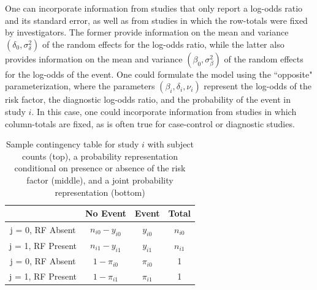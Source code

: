 \documentclass[AMA,STIX1COL]{WileyNJD-v2}
\begin{document}
One can incorporate information from studies that only report a log-odds ratio and its standard error, as well as from studies in which the row-totals were fixed by investigators. The former provide information on the mean and variance $(\delta_0, \sigma^2_\delta)$ of the random effects for the log-odds ratio, while the latter also provides information on the mean and variance $(\beta_0, \sigma^2_\beta)$ of the random effects for the log-odds of the event. One could formulate the model using the ``opposite" parameterization, where the parameters $(\beta_i, \delta_i, \nu_i)$ represent the log-odds of the risk factor, the diagnostic log-odds ratio, and the probability of the event in study $i$. In this case, one could incorporate information from studies in which column-totals are fixed, as is often true for case-control or diagnostic studies. 




\clearpage 


\begin{table}[ht]
\centering
\begin{tabular}{c|cc|c}
                           & No Event          & Event       & Total        \\ \hline
j = 0, RF Absent  & $n_{i0} - y_{i0}$ & $y_{i0}$    & $n_{i0}$     \\
j = 1, RF Present & $n_{i1} - y_{i1}$ & $y_{i1}$    & $n_{i1}$     \\ \hline
j = 0, RF Absent & $1 - \pi_{i0}$    & $\pi_{i0}$  & 1            \\
j = 1, RF Present & $1 - \pi_{i1}$    & $\pi_{i1}$  & 1            \\ \hline 
\end{tabular}
\caption{Sample contingency table for study $i$ with subject counts (top), a probability representation conditional on presence or absence of the risk factor (middle), and a joint probability representation (bottom)}
\label{table:RCT_contingency}
\end{table}
\end{document}
